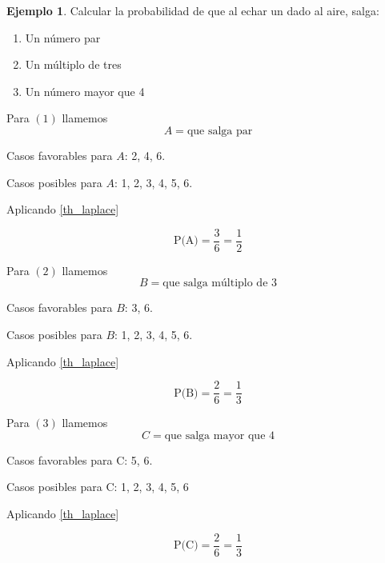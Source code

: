 \documentclass[]{book}
\theoremstyle{plain}
\theoremstyle{definition}
\newtheorem{example}[theorem]{Ejemplo}
\begin{document}
\begin{example}
  Calcular la probabilidad de que al echar un dado al aire, salga:
\begin{enumerate}[(1)]
  \item Un número par
  \item Un múltiplo de tres
  \item Un número mayor que 4
\end{enumerate}
Para $(1)$
llamemos \[A=\text{que salga par}\]

Casos favorables para $A$: 2, 4, 6.

Casos posibles para $A$: 1, 2, 3, 4, 5, 6.

Aplicando \ref{th_laplace}

$$\displaystyle \text{P(A)}=\frac{3}{6}=\frac{1}{2}$$

Para $(2)$
llamemos \[B=\text{que salga múltiplo de 3}\]

Casos favorables para $B$: 3, 6.

Casos posibles para $B$: 1, 2, 3, 4, 5, 6.

Aplicando \ref{th_laplace}

$$\displaystyle \text{P(B)}=\frac{2}{6}=\frac{1}{3}$$

Para $(3)$ llamemos 
\[C = \text{que salga mayor que 4}\]

Casos favorables para C: 5, 6.

Casos posibles para C: 1, 2, 3, 4, 5, 6

Aplicando \ref{th_laplace}

$$\displaystyle \text{P(C)}=\frac{2}{6}=\frac{1}{3}$$

\end{example}
\end{document}
